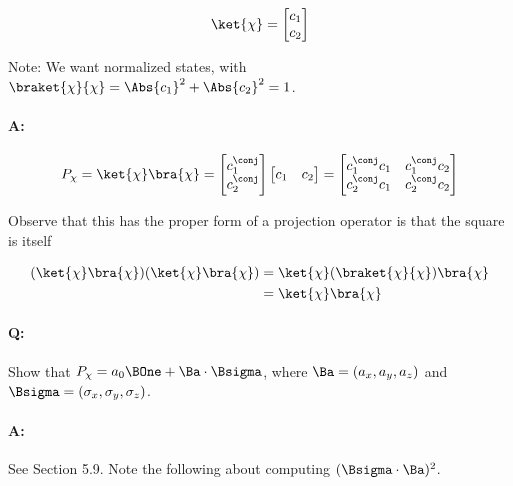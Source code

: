 \begin{align}\label{eqn:PHY356HNov2:120}
\ket{\chi} =
\begin{bmatrix}
c_1 \\
c_2
\end{bmatrix}
\end{align}

Note: We want normalized states, with $\braket{\chi}{\chi} = \Abs{c_1}^2 + \Abs{c_2}^2 = 1$.


\paragraph{A:}

\begin{align}\label{eqn:PHY356HNov2:130}
P_{\chi} = \ket{\chi}\bra{\chi} =
\begin{bmatrix}
c_1^\conj \\
c_2^\conj
\end{bmatrix}
\begin{bmatrix}
c_1 & c_2
\end{bmatrix}
=
\begin{bmatrix}
c_1^\conj c_1 & c_1^\conj c_2 \\
c_2^\conj c_1 & c_2^\conj c_2
\end{bmatrix}
\end{align}

Observe that this has the proper form of a projection operator is that the square is itself

\begin{align*}
(\ket{\chi}\bra{\chi}) (\ket{\chi}\bra{\chi})
&= \ket{\chi} (\braket{\chi}{\chi} )\bra{\chi} \\
&= \ket{\chi} \bra{\chi}
\end{align*}

\paragraph{Q:} Show that $P_{\chi} = a_0 \BOne + \Ba \cdot \Bsigma$, where $\Ba = (a_x, a_y, a_z)$ and $\Bsigma = (\sigma_x, \sigma_y, \sigma_z)$.

\paragraph{A:} See Section 5.9.  Note the following about computing $(\Bsigma \cdot \Ba)^2$.

